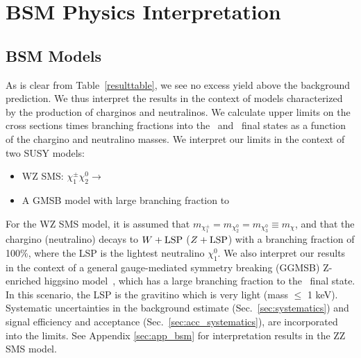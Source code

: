 \section{BSM Physics Interpretation}
\label{sec:bsm}

\subsection{BSM Models}
\label{sec:bsmmodels}

As is clear from Table~\ref{resulttable}, we see no excess yield above the background prediction.
We thus interpret the results in the context of models characterized by the 
production of charginos and neutralinos.
We calculate upper limits on the cross sections times branching fractions into the \wzmet\ and \zzmet\
final states as a function of the chargino and neutralino masses. 
We interpret our limits in the context of two %
SUSY models:

\begin{itemize}
\item WZ SMS: $\chi^{\pm}_{1}\chi^{0}_{2} \rightarrow$\wzmet
\item A GMSB model with large branching fraction to \zzmet~\cite{ref:ewkino}
\end{itemize}

For the WZ %
SMS model, %
it is assumed that $m_{\chi^{\pm}_1} = m_{\chi_2^0} = m_{\chi_3^0} \equiv m_\chi$,
and that the chargino (neutralino) decays to $W+\rm{LSP}$ ($Z+\rm{LSP}$) with a branching fraction of 100\%,
where the LSP is the lightest neutralino $\chi^{0}_{1}$. 
We also interpret our results in the context of a general gauge-mediated symmetry breaking (GGMSB) 
Z-enriched higgsino model~\cite{ref:ewkino}, which has a large branching fraction to the \zzmet\ final 
state. In this scenario, the LSP is the gravitino which is very light (mass $\leq$ 1 keV).
Systematic uncertainties in the background estimate (Sec.~\ref{sec:systematics}) and signal efficiency
and acceptance (Sec.~\ref{sec:acc_systematics}), are incorporated into the limits.
See Appendix \ref{sec:app_bsm} for interpretation results in the ZZ SMS model.


\clearpage

